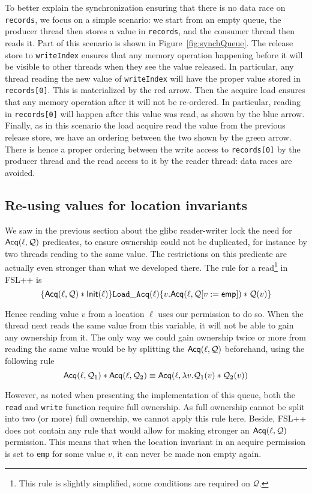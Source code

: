 To better explain the synchronization ensuring that there is no data race on \texttt{records}, we focus on a simple scenario: we start from an empty queue, the producer thread then stores a value in \texttt{records}, and the consumer thread then reads it. Part of this scenario is shown in Figure~\ref{fig:synchQueue}. The release store to \texttt{writeIndex} ensures that any memory operation happening before it will be visible to other threads when they see the value released. In particular, any thread reading the new value of \texttt{writeIndex} will have the proper value stored in \texttt{records[0]}. This is materialized by the red arrow. Then the acquire load ensures that any memory operation after it will not be re-ordered. In particular, reading in \texttt{records[0]} will happen after this value was read, as shown by the blue arrow. Finally, as in this scenario the load acquire read the value from the previous release store, we have an ordering between the two shown by the green arrow. There is hence a proper ordering between the write access to \texttt{records[0]} by the producer thread and the read access to it by the reader thread: data races are avoided.

\subsection{Re-using values for location invariants}
We saw in the previous section about the glibc reader-writer lock the need for $\operatorname{\mathsf{Acq}}(\ell, \mathcal{Q})$ predicates, to ensure ownership could not be duplicated, for instance by two threads reading to the same value. The restrictions on this predicate are actually even stronger than what we developed there. The rule for a read\footnote{This rule is slightly simplified, some conditions are required on $\mathcal{Q}$.} in FSL++ is 
\[
		\{\operatorname{\mathsf{Acq}}(\ell, \mathcal{Q}) * \mathsf{Init(\ell)}\} \mathtt{Load\_Acq}(\ell) \{v.\mathsf{Acq}(\ell, \mathcal{Q}[v:=\mathsf{emp}]) * \mathcal{Q}(v)\}
\]

Hence reading value $v$ from a location $\ell$ uses our permission to do so. When the thread next reads the same value from this variable, it will not be able to gain any ownership from it. The only way we could gain ownership twice or more from reading the same value would be by splitting the $\operatorname{\mathsf{Acq}}(\ell, \mathcal{Q})$ beforehand, using the following rule
\[
		\operatorname{\mathsf{Acq}}(\ell, \mathcal{Q}_{1}) * \operatorname{\mathsf{Acq}}(\ell, \mathcal{Q}_{2}) \equiv \mathsf{Acq}(\ell, \lambda v. \mathcal{Q}_1(v) * \mathcal{Q}_2(v))
\]

However, as noted when presenting the implementation of this queue, both the \texttt{read} and \texttt{write} function require full ownership. As full ownership cannot be split into two (or more) full ownership, we cannot apply this rule here. Beside, FSL++ does not contain any rule that would allow for making stronger an $\operatorname{\mathsf{Acq}}(\ell, \mathcal{Q})$ permission. This means that when the location invariant in an acquire permission is set to \texttt{emp} for some value $v$, it can never be made non empty again. 

